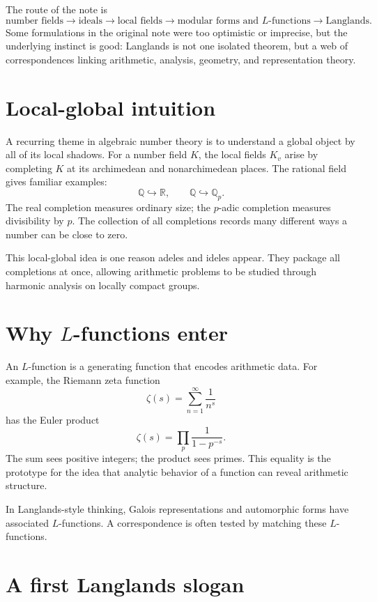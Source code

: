 The route of the note is
\[
  \text{number fields}\to \text{ideals}\to \text{local fields}\to
  \text{modular forms and }L\text{-functions}\to \text{Langlands}.
\]
Some formulations in the original note were too optimistic or imprecise, but the underlying instinct is good: Langlands is not one isolated theorem, but a web of correspondences linking arithmetic, analysis, geometry, and representation theory.


\section{Local-global intuition}

A recurring theme in algebraic number theory is to understand a global object by all of its local shadows.  For a number field \(K\), the local fields \(K_v\) arise by completing \(K\) at its archimedean and nonarchimedean places.  The rational field gives familiar examples:
\[
  \mathbb Q\hookrightarrow\mathbb R,\qquad
  \mathbb Q\hookrightarrow\mathbb Q_p.
\]
The real completion measures ordinary size; the \(p\)-adic completion measures divisibility by \(p\).  The collection of all completions records many different ways a number can be close to zero.

This local-global idea is one reason adeles and ideles appear.  They package all completions at once, allowing arithmetic problems to be studied through harmonic analysis on locally compact groups.

\section[Why L-functions enter]{Why \(L\)-functions enter}

An \(L\)-function is a generating function that encodes arithmetic data.  For example, the Riemann zeta function
\[
  \zeta(s)=\sum_{n=1}^{\infty}\frac1{n^s}
\]
has the Euler product
\[
  \zeta(s)=\prod_p\frac1{1-p^{-s}}.
\]
The sum sees positive integers; the product sees primes.  This equality is the prototype for the idea that analytic behavior of a function can reveal arithmetic structure.

In Langlands-style thinking, Galois representations and automorphic forms have associated \(L\)-functions.  A correspondence is often tested by matching these \(L\)-functions.

\section{A first Langlands slogan}

